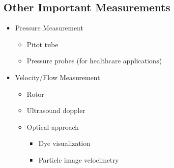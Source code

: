 \subsection{Other Important Measurements}
\begin{itemize}
  \item Pressure Measurement
        \begin{itemize}
          \item Pitot tube
          \item Pressure probes (for healthcare applications)
        \end{itemize}
  \item Velocity/Flow Measurement
        \begin{itemize}
          \item Rotor
          \item Ultrasound doppler
          \item Optical approach
                \begin{itemize}
                  \item Dye visualization
                  \item Particle image velocimetry
                \end{itemize}
        \end{itemize}
\end{itemize}
